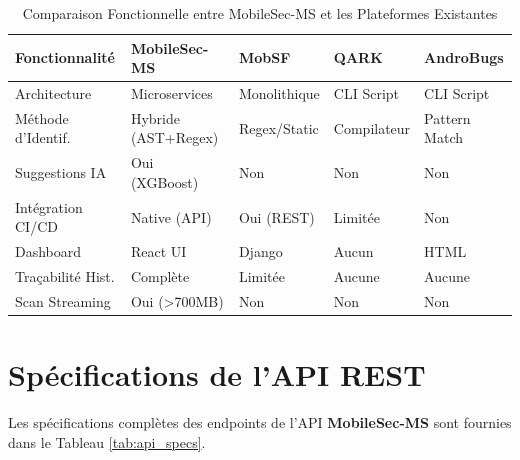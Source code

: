 \documentclass[
  journal=largetwo,
  manuscript=article-type,
  year=2025,
  volume=1,
]{cup-journal}
\begin{document}
\begin{table}[hbt!]
\centering
\caption{Comparaison Fonctionnelle entre MobileSec-MS et les Plateformes Existantes}
\label{tab:func_comparison}
\begin{tabular}{p{3cm}p{2.5cm}p{2.5cm}p{2.5cm}p{2.5cm}}
\toprule
\textbf{Fonctionnalité} & \textbf{MobileSec-MS} & \textbf{MobSF} & \textbf{QARK} & \textbf{AndroBugs} \\
\midrule
Architecture & Microservices & Monolithique & CLI Script & CLI Script \\
Méthode d'Identif. & Hybride (AST+Regex) & Regex/Static & Compilateur & Pattern Match \\
Suggestions IA & Oui (XGBoost) & Non & Non & Non \\
Intégration CI/CD & Native (API) & Oui (REST) & Limitée & Non \\
Dashboard & React UI & Django & Aucun & HTML \\
Traçabilité Hist. & Complète & Limitée & Aucune & Aucune \\
Scan Streaming & Oui (>700MB) & Non & Non & Non \\
\bottomrule
\end{tabular}
\end{table}

\onecolumn
\appendix

\section{Spécifications de l'API REST}
\label{app:api}

Les spécifications complètes des endpoints de l'API \textbf{MobileSec-MS} sont fournies dans le Tableau \ref{tab:api_specs}.
\end{document}
